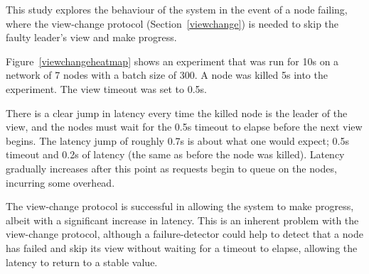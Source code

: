 This study explores the behaviour of the system in the event of a node failing, where the view-change protocol (Section~\ref{viewchange}) is needed to skip the faulty leader's view and make progress.

Figure~\ref{viewchangeheatmap} shows an experiment that was run for 10s on a network of 7 nodes with a batch size of 300. A node was killed 5s into the experiment. The view timeout was set to 0.5s.

There is a clear jump in latency every time the killed node is the leader of the view, and the nodes must wait for the 0.5s timeout to elapse before the next view begins. The latency jump of roughly 0.7s is about what one would expect; 0.5s timeout and 0.2s of latency (the same as before the node was killed). Latency gradually increases after this point as requests begin to queue on the nodes, incurring some overhead.

The view-change protocol is successful in allowing the system to make progress, albeit with a significant increase in latency. This is an inherent problem with the view-change protocol, although a failure-detector could help to detect that a node has failed and skip its view without waiting for a timeout to elapse, allowing the latency to return to a stable value.









